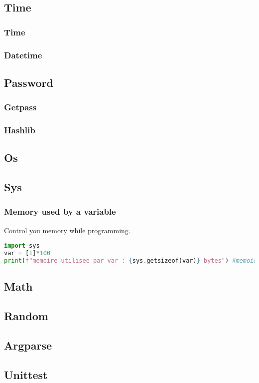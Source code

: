 \documentclass[a4paper, 12pt]{article}
\begin{document}
\subsection{Time}
\subsubsection{Time}
\subsubsection{Datetime}
\subsection{Password}
\subsubsection{Getpass}
\subsubsection{Hashlib}
\subsection{Os}

\subsection{Sys}
\subsubsection{Memory used by a variable}
Control you memory while programming. 
\begin{lstlisting}[language=Python]
import sys
var = [1]*100
print(f"memoire utilisee par var : {sys.getsizeof(var)} bytes") #memoire utilisee par var : 856 bytes
\end{lstlisting}

\subsection{Math}
\subsection{Random}
\subsection{Argparse}
\subsection{Unittest}
\end{document}
